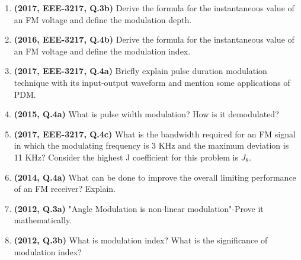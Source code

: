 \documentclass[12pt, a4paper]{article}
\begin{document}
\begin{enumerate}
		\item \textbf{(2017, EEE-3217, Q.3b)} Derive the formula for the instantaneous value of an FM voltage and define the modulation depth.
		\item \textbf{(2016, EEE-3217, Q.4b)} Derive the formula for the instantaneous value of an FM voltage and define the modulation index.
		
		\item \textbf{(2017, EEE-3217, Q.4a)} Briefly explain pulse duration modulation technique with its input-output waveform and mention some applications of PDM.
		\item \textbf{(2015, Q.4a)} What is pulse width modulation? How is it demodulated?
		
		\item \textbf{(2017, EEE-3217, Q.4c)} What is the bandwidth required for an FM signal in which the modulating frequency is 3 KHz and the maximum deviation is 11 KHz? Consider the highest J coefficient for this problem is $J_8$.
		
		\item \textbf{(2014, Q.4a)} What can be done to improve the overall limiting performance of an FM receiver? Explain.
		
		\item \textbf{(2012, Q.3a)} "Angle Modulation is non-linear modulation"-Prove it mathematically.
		\item \textbf{(2012, Q.3b)} What is modulation index? What is the significance of modulation index?
		
	\end{enumerate}
	
\end{document}
